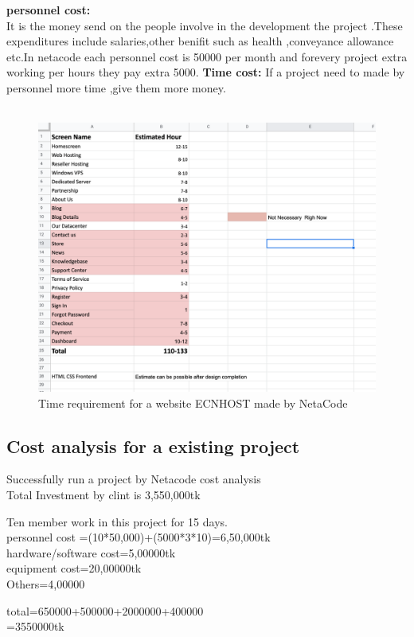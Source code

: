 \documentclass[a4paper,12pt]{report}
\begin{document}
\subitem \textbf{personnel cost:\\}It is the money send on the people involve in the development the project .These expenditures include salaries,other benifit such as health ,conveyance allowance etc.In netacode
each personnel cost is 50000 per month and forevery project extra working per hours they pay extra 5000.
\subitem \textbf{Time cost:} 
If a project need to made by personnel more time ,give them more money.\\ \\
\begin{figure}[h]
	\centering
	\includegraphics[width=1 \linewidth]{8_1}
	\caption{Time requirement for a website ECNHOST made by NetaCode }
	\label{fig:81}
\end{figure}
\subsection{Cost analysis for a existing project}
Successfully run a project by Netacode cost analysis\\
Total Investment by clint is 3,550,000tk
\begin{center}
	Ten member work in this project for 15 days.\\
	personnel cost =(10*50,000)+(5000*3*10)=6,50,000tk\\
	hardware/software cost=5,00000tk\\
	equipment cost=20,00000tk\\
	Others=4,00000\\
\end{center}
\begin{center}
	total=650000+500000+2000000+400000\\
	=3550000tk\\
\end{center}
\end{document}
